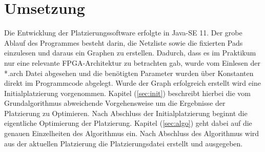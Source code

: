 \chapter{Umsetzung}
    Die Entwicklung der Platzierungssoftware erfolgte in Java-SE 11.
    Der grobe Ablauf des Programmes besteht darin, die Netzliste sowie die fixierten Pads
    einzulesen und daraus ein Graphen zu erstellen.
    Dadurch, dass es im Praktikum nur eine relevante FPGA-Architektur zu betrachten gab,
    wurde vom Einlesen der *.arch Datei abgesehen und die benötigten Parameter wurden über
    Konstanten direkt im Programmcode abgelegt. Wurde der Graph erfolgreich erstellt wird
    eine Initialplatzierung vorgenommen. 
    Kapitel (\ref{sec:init}) beschreibt hierbei die vom Grundalgorithmus abweichende Vorgehensweise
    um die Ergebnisse der Platzierung zu Optimieren. Nach Abschluss der Initialplatzierung
    beginnt die eigentliche Optimierung der Platzierung. Kapitel (\ref{sec:algo}) geht dabei auf die genauen
    Einzelheiten des Algorithmus ein.
    Nach Abschluss des Algorithmus wird aus der aktuellen Platzierung die
    Platzierungsdatei erstellt und ausgegeben.


